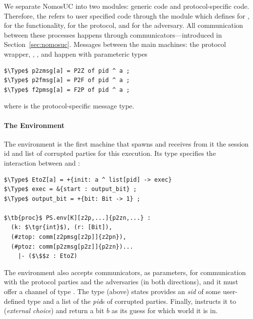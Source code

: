 We separate NomosUC into two modules: generic code and protocol-specific code. 
Therefore, the  refers to user specified code through the  module which defines  for \Z,  for the functionality,  for the protocol, and  for the adversary.
All communication between these processes happens through communicators---introduced in Section~\ref{sec:nomosuc}.
Messages between the main machines: the protocol wrapper, \A, \Z, and \F happen with parameteric types
\begin{lstlisting}[basicstyle=\small\BeraMonottFamily, frame=single, mathescape]
$\Type$ p2zmsg[a] = P2Z of pid ^ a ;
$\Type$ p2fmsg[a] = P2F of pid ^ a ;
$\Type$ f2pmsg[a] = F2P of pid ^ a ;
\end{lstlisting}
where  is the protocol-specific message type.

\paragraph{The Environment}
The environment is the first machine that  spawns and receives from it the session id and list of corrupted parties for this execution.
Its type specifies the interaction between  and \Z:
\begin{lstlisting}[basicstyle=\small\BeraMonottFamily, mathescape, frame=single]
$\Type$ EtoZ[a] = +{init: a ^ list[pid] -> exec} 
$\Type$ exec = &{start : output_bit} ;
$\Type$ output_bit = +{bit: Bit -> 1} ;

$\tb{proc}$ PS.env[K][z2p,...]{p2zn,...} : 
  (k: $\tgr{int}$), (r: [Bit]), 
  (#ztop: comm[z2pmsg[z2p]]{z2pn}),
  (#ptoz: comm[p2zmsg[p2z]]{p2zn})...
    |- ($\$$z : EtoZ)
\end{lstlisting}
The environment also accepts communicators, as parameters, for communication with the protocol parties and the adversaries (in both directions), and it must offer a channel of type .
The type (above) states \Z provides an \emph{sid} of some user-defined type  and a list of the \emph{pid}s of corrupted parties. 
Finally,  instructs it to  (\emph{external choice}) and return a bit $b$ as its guess for which world it is in.


